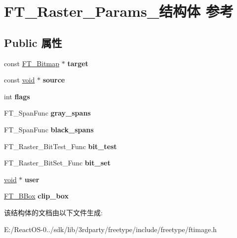 \hypertarget{struct_f_t___raster___params__}{}\section{F\+T\+\_\+\+Raster\+\_\+\+Params\+\_\+结构体 参考}
\label{struct_f_t___raster___params__}
\subsection*{Public 属性}
\begin{DoxyCompactItemize}
\item 
\mbox{\label{struct_f_t___raster___params___a2ba8941740db23ec91302aa9bd154da3}} 
const \hyperlink{struct_f_t___bitmap__}{F\+T\+\_\+\+Bitmap} $\ast$ {\bfseries target}
\item 
\mbox{\label{struct_f_t___raster___params___a9be95865384791b018f7a9665a062ee5}} 
const \hyperlink{interfacevoid}{void} $\ast$ {\bfseries source}
\item 
\mbox{\label{struct_f_t___raster___params___a1a28ab69b8296b4378886d1a2b57d333}} 
int {\bfseries flags}
\item 
\mbox{\label{struct_f_t___raster___params___a456191f1944775933e3d9d36c8632c35}} 
F\+T\+\_\+\+Span\+Func {\bfseries gray\+\_\+spans}
\item 
\mbox{\label{struct_f_t___raster___params___a42c30e60ad5e243cf78833232e052b47}} 
F\+T\+\_\+\+Span\+Func {\bfseries black\+\_\+spans}
\item 
\mbox{\label{struct_f_t___raster___params___aff3c1a2a7eda24136a46715128d24ed6}} 
F\+T\+\_\+\+Raster\+\_\+\+Bit\+Test\+\_\+\+Func {\bfseries bit\+\_\+test}
\item 
\mbox{\label{struct_f_t___raster___params___ac66c3c44fcb63c254a46170d85d653c0}} 
F\+T\+\_\+\+Raster\+\_\+\+Bit\+Set\+\_\+\+Func {\bfseries bit\+\_\+set}
\item 
\mbox{\label{struct_f_t___raster___params___af78bac59f93c989840bbcbcbefd77c55}} 
\hyperlink{interfacevoid}{void} $\ast$ {\bfseries user}
\item 
\mbox{\label{struct_f_t___raster___params___ab32f75f19d9cacb20e410886c055e306}} 
\hyperlink{struct_f_t___b_box__}{F\+T\+\_\+\+B\+Box} {\bfseries clip\+\_\+box}
\end{DoxyCompactItemize}


该结构体的文档由以下文件生成\+:\begin{DoxyCompactItemize}
\item 
E\+:/\+React\+O\+S-\/0../sdk/lib/3rdparty/freetype/include/freetype/ftimage.\+h\end{DoxyCompactItemize}
